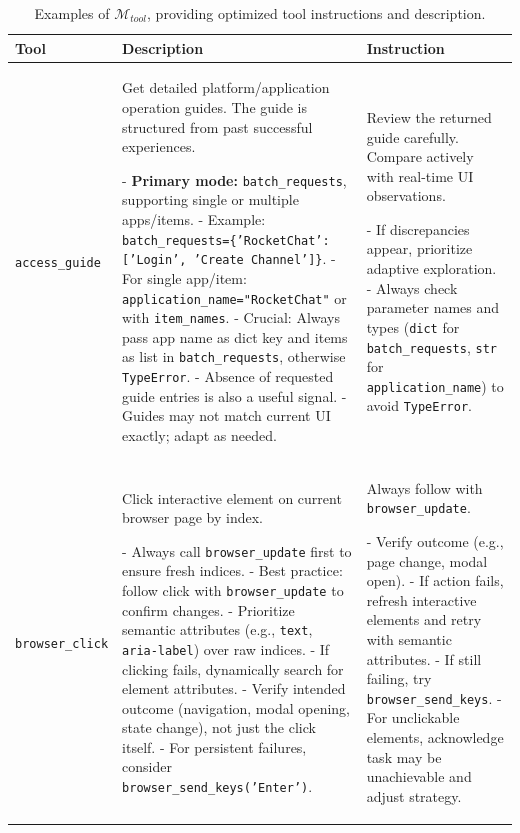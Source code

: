 \renewcommand{\arraystretch}{1.3}
\begin{table}[htbp]
\centering
\small
\caption{Examples of $\mathcal{M}_{tool}$, providing optimized tool instructions and description.}
\vspace{5pt}
\label{tab:tool_memory}
\begin{tabular}{l|p{5cm}|p{4cm}}
\toprule
\textbf{Tool} & \textbf{Description} & \textbf{Instruction} \\
\midrule

\texttt{access\_guide} & 
Get detailed platform/application operation guides. The guide is structured from past successful experiences.  

- \textbf{Primary mode:} \texttt{batch\_requests}, supporting single or multiple apps/items.  
- Example: \texttt{batch\_requests=\{'RocketChat': ['Login', 'Create Channel']\}}.  
- For single app/item: \texttt{application\_name="RocketChat"} or with \texttt{item\_names}.  
- Crucial: Always pass app name as dict key and items as list in \texttt{batch\_requests}, otherwise \texttt{TypeError}.  
- Absence of requested guide entries is also a useful signal.  
- Guides may not match current UI exactly; adapt as needed. &
Review the returned guide carefully. Compare actively with real-time UI observations.  

- If discrepancies appear, prioritize adaptive exploration.  
- Always check parameter names and types (\texttt{dict} for \texttt{batch\_requests}, \texttt{str} for \texttt{application\_name}) to avoid \texttt{TypeError}. \\

\midrule
\texttt{browser\_click} &
Click interactive element on current browser page by index.  

- Always call \texttt{browser\_update} first to ensure fresh indices.  
- Best practice: follow click with \texttt{browser\_update} to confirm changes.  
- Prioritize semantic attributes (e.g., \texttt{text}, \texttt{aria-label}) over raw indices.  
- If clicking fails, dynamically search for element attributes.  
- Verify intended outcome (navigation, modal opening, state change), not just the click itself.  
- For persistent failures, consider \texttt{browser\_send\_keys('Enter')}. &
Always follow with \texttt{browser\_update}.  

- Verify outcome (e.g., page change, modal open).  
- If action fails, refresh interactive elements and retry with semantic attributes.  
- If still failing, try \texttt{browser\_send\_keys}.  
- For unclickable elements, acknowledge task may be unachievable and adjust strategy. \\


\end{tabular}
\end{table}
